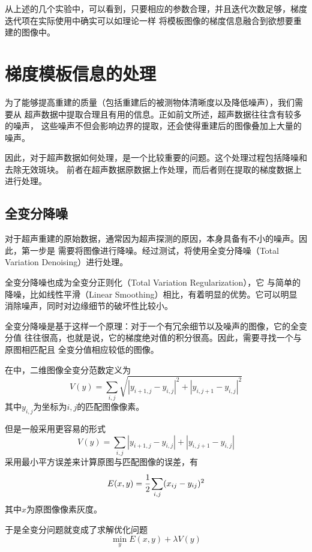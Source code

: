 从上述的几个实验中，可以看到，只要相应的参数合理，并且迭代次数足够，梯度迭代项在实际使用中确实可以如理论一样
将模板图像的梯度信息融合到欲想要重建的图像中。

\section{梯度模板信息的处理}
为了能够提高重建的质量（包括重建后的被测物体清晰度以及降低噪声），我们需要从
超声数据中提取合理且有用的信息。正如前文所述，超声数据往往含有较多的噪声，
这些噪声不但会影响边界的提取，还会使得重建后的图像叠加上大量的噪声。

因此，对于超声数据如何处理，是一个比较重要的问题。这个处理过程包括降噪和去除无效斑块。
前者在超声数据原数据上作处理，而后者则在提取的梯度数据上进行处理。


\subsection{全变分降噪}
对于超声重建的原始数据，通常因为超声探测的原因，本身具备有不小的噪声。因此，第一步是
需要将图像进行降噪。经过测试，将使用全变分降噪（Total Variation Denoising）进行处理。

全变分降噪也成为全变分正则化（Total Variation Regularization），它
与简单的降噪，比如线性平滑（Linear Smoothing）相比，有着明显的优势。它可以明显
消除噪声，同时对边缘细节的破坏性比较小\cite{strong2003edge}。

全变分降噪是基于这样一个原理：对于一个有冗余细节以及噪声的图像，它的全变分值
往往很高，也就是说，它的梯度绝对值的积分很高。因此，需要寻找一个与原图相匹配且
全变分值相应较低的图像\cite{rudin1992nonlinear}。

在\cite{rudin1992nonlinear}中，二维图像全变分范数定义为
\begin{equation*}
V(y)=\sum_{i,j}\sqrt{|y_{i+1,j}-y_{i,j}|^2+|y_{i,j+1}-y_{i,j}|^2}
\end{equation*}
其中$y_{i,j}$为坐标为$i,j$的匹配图像像素。

但是一般采用更容易的形式
\begin{equation*}
V(y)=\sum_{i,j}|y_{i+1,j}-y_{i,j}|+|y_{i,j+1}-y_{i,j}|
\end{equation*}
采用最小平方误差来计算原图与匹配图像的误差，有
\begin{equation*}
E(x,y)=\cfrac{1}{2}\sum_{i,j}(x_{ij}-y_{ij})^2
\end{equation*}
其中$x$为原图像像素灰度。

于是全变分问题就变成了求解优化问题
\begin{equation*}
\min_yE(x,y)+\lambda V(y)
\end{equation*}

